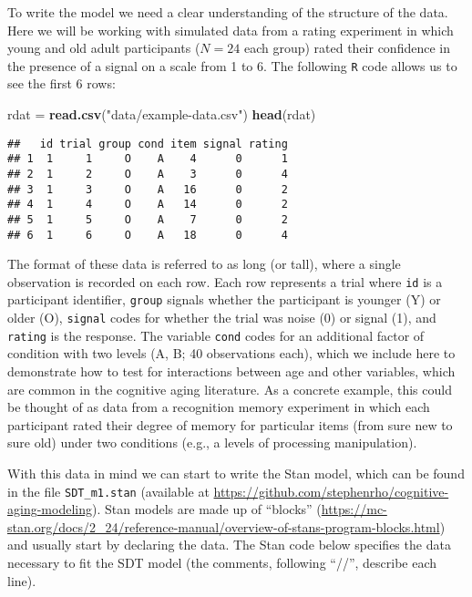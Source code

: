 \documentclass[
  english,
  ,man,floatsintext]{apa6}
\newenvironment{Shaded}{\begin{snugshade}}{\end{snugshade}}
\newcommand{\KeywordTok}[1]{\textcolor[rgb]{0.13,0.29,0.53}{\textbf{#1}}}
\newcommand{\NormalTok}[1]{#1}
\newcommand{\StringTok}[1]{\textcolor[rgb]{0.31,0.60,0.02}{#1}}
\begin{document}
To write the model we need a clear understanding of the structure of the data. Here we will be working with simulated data from a rating experiment in which young and old adult participants (\(N=24\) each group) rated their confidence in the presence of a signal on a scale from 1 to 6. The following \texttt{R} code allows us to see the first 6 rows:

\begin{Shaded}
\begin{Highlighting}[]
\NormalTok{rdat =}\StringTok{ }\KeywordTok{read.csv}\NormalTok{(}\StringTok{"data/example-data.csv"}\NormalTok{)}
\KeywordTok{head}\NormalTok{(rdat)}
\end{Highlighting}
\end{Shaded}

\begin{verbatim}
##   id trial group cond item signal rating
## 1  1     1     O    A    4      0      1
## 2  1     2     O    A    3      0      4
## 3  1     3     O    A   16      0      2
## 4  1     4     O    A   14      0      2
## 5  1     5     O    A    7      0      2
## 6  1     6     O    A   18      0      4
\end{verbatim}

The format of these data is referred to as long (or tall), where a single observation is recorded on each row. Each row represents a trial where \texttt{id} is a participant identifier, \texttt{group} signals whether the participant is younger (Y) or older (O), \texttt{signal} codes for whether the trial was noise (0) or signal (1), and \texttt{rating} is the response. The variable \texttt{cond} codes for an additional factor of condition with two levels (A, B; 40 observations each), which we include here to demonstrate how to test for interactions between age and other variables, which are common in the cognitive aging literature. As a concrete example, this could be thought of as data from a recognition memory experiment in which each participant rated their degree of memory for particular items (from sure new to sure old) under two conditions (e.g., a levels of processing manipulation).

With this data in mind we can start to write the Stan model, which can be found in the file \texttt{SDT\_m1.stan} (available at \url{https://github.com/stephenrho/cognitive-aging-modeling}). Stan models are made up of \enquote{blocks} (\url{https://mc-stan.org/docs/2_24/reference-manual/overview-of-stans-program-blocks.html}) and usually start by declaring the data. The Stan code below specifies the data necessary to fit the SDT model (the comments, following \enquote{//}, describe each line).
\end{document}
